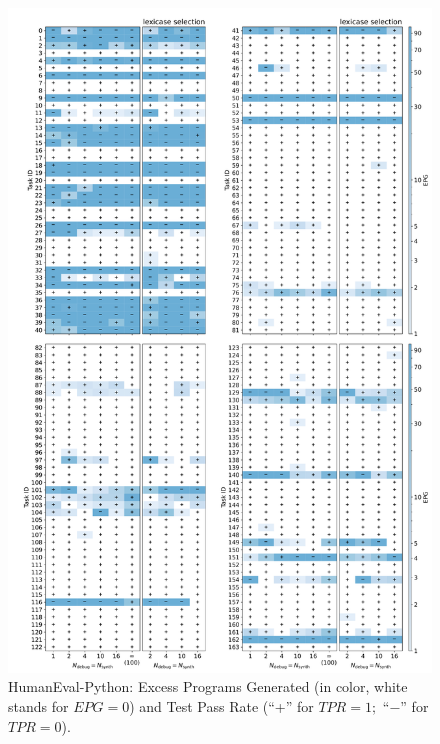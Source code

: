 \begin{figure}[H]
  \centering
  \includegraphics[width=.85\linewidth, trim={0mm 2.8mm 0mm 2mm}, clip]{images/epg_humaneval_Python_gpt35_01.pdf}
  \caption{HumanEval-Python: Excess Programs Generated (in color, white stands for $EPG=0$) and Test Pass Rate (``+'' for $TPR=1;$ ``$-$'' for $TPR=0$).}
  \label{fig:epg-humaneval-python}
\end{figure}

